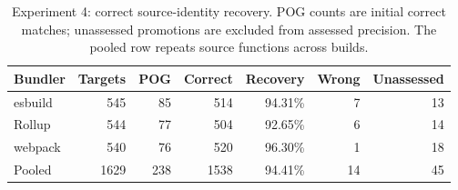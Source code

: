 \begin{table}[htbp]
\caption{Experiment 4: correct source-identity recovery. POG counts are initial correct matches; unassessed promotions are excluded from assessed precision. The pooled row repeats source functions across builds.}
\label{tab:exp4-recovery}
\centering\small
\begin{tabular}{lrrrrrr}
\toprule
Bundler & Targets & POG & Correct & Recovery & Wrong & Unassessed\\
\midrule
esbuild & 545 & 85 & 514 & 94.31\% & 7 & 13\\
Rollup & 544 & 77 & 504 & 92.65\% & 6 & 14\\
webpack & 540 & 76 & 520 & 96.30\% & 1 & 18\\
Pooled & 1629 & 238 & 1538 & 94.41\% & 14 & 45\\
\bottomrule
\end{tabular}
\end{table}
